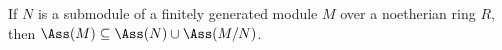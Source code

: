 If $N$ is a submodule of a finitely generated module $M$ over a noetherian ring
$R$, then $\Ass(M) \subseteq \Ass(N) \cup \Ass(M/N)$.
